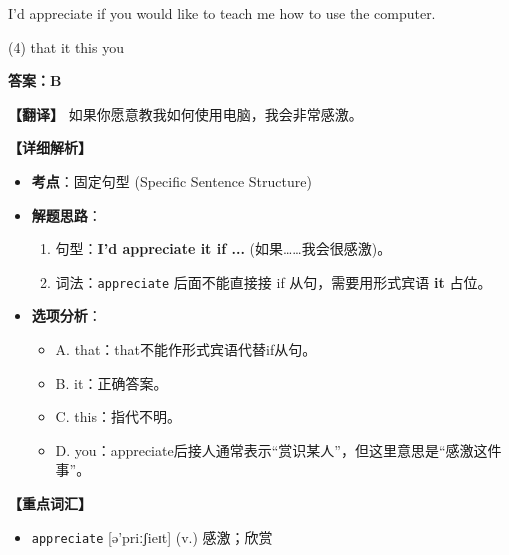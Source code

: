 \documentclass[11pt, a4paper]{article}
\newcommand{\analysis}[4]{
    \begin{solutionbox}
        \textbf{答案：#1}
        
        \textbf{【翻译】} #2
        
        \textbf{【详细解析】}
        #3
        
        \textbf{【重点词汇】}
        #4
    \end{solutionbox}
}
\newcommand{\blank}{\underline{\hspace{1.5cm}}}
\begin{document}
\begin{questions}
    \item I'd appreciate \blank if you would like to teach me how to use the computer.
    \begin{tasks}(4)
        \task that \task it \task this \task you
    \end{tasks}
    \analysis{B}{如果你愿意教我如何使用电脑，我会非常感激。}{
        \begin{itemize}
            \item \textbf{考点}：固定句型 (Specific Sentence Structure)
            \item \textbf{解题思路}：
                \begin{enumerate}
                    \item 句型：\textbf{I'd appreciate it if ...} (如果……我会很感激)。
                    \item 词法：\texttt{appreciate} 后面不能直接接 if 从句，需要用形式宾语 \textbf{it} 占位。
                \end{enumerate}
            \item \textbf{选项分析}：
                \begin{itemize}
                    \item A. that：that不能作形式宾语代替if从句。
                    \item B. it：正确答案。
                    \item C. this：指代不明。
                    \item D. you：appreciate后接人通常表示“赏识某人”，但这里意思是“感激这件事”。
                \end{itemize}
        \end{itemize}
    }{
        \begin{itemize}
            \item \texttt{appreciate} [ə'priːʃieɪt] (v.) 感激；欣赏
        \end{itemize}
    }


\end{questions}
\end{document}
